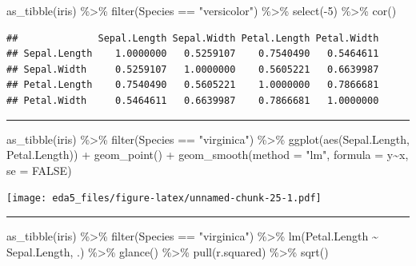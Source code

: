 \documentclass[
]{article}
\newenvironment{Shaded}{\begin{snugshade}}{\end{snugshade}}
\newcommand{\AttributeTok}[1]{\textcolor[rgb]{0.77,0.63,0.00}{#1}}
\newcommand{\ConstantTok}[1]{\textcolor[rgb]{0.00,0.00,0.00}{#1}}
\newcommand{\DecValTok}[1]{\textcolor[rgb]{0.00,0.00,0.81}{#1}}
\newcommand{\FunctionTok}[1]{\textcolor[rgb]{0.00,0.00,0.00}{#1}}
\newcommand{\NormalTok}[1]{#1}
\newcommand{\SpecialCharTok}[1]{\textcolor[rgb]{0.00,0.00,0.00}{#1}}
\newcommand{\StringTok}[1]{\textcolor[rgb]{0.31,0.60,0.02}{#1}}
\begin{document}
\begin{Shaded}
\begin{Highlighting}[]
\FunctionTok{as\_tibble}\NormalTok{(iris) }\SpecialCharTok{\%\textgreater{}\%} \FunctionTok{filter}\NormalTok{(Species }\SpecialCharTok{==} \StringTok{"versicolor"}\NormalTok{) }\SpecialCharTok{\%\textgreater{}\%} \FunctionTok{select}\NormalTok{(}\SpecialCharTok{{-}}\DecValTok{5}\NormalTok{) }\SpecialCharTok{\%\textgreater{}\%} \FunctionTok{cor}\NormalTok{()}
\end{Highlighting}
\end{Shaded}

\begin{verbatim}
##              Sepal.Length Sepal.Width Petal.Length Petal.Width
## Sepal.Length    1.0000000   0.5259107    0.7540490   0.5464611
## Sepal.Width     0.5259107   1.0000000    0.5605221   0.6639987
## Petal.Length    0.7540490   0.5605221    1.0000000   0.7866681
## Petal.Width     0.5464611   0.6639987    0.7866681   1.0000000
\end{verbatim}

\begin{center}\rule{0.5\linewidth}{0.5pt}\end{center}

\begin{Shaded}
\begin{Highlighting}[]
\FunctionTok{as\_tibble}\NormalTok{(iris) }\SpecialCharTok{\%\textgreater{}\%} \FunctionTok{filter}\NormalTok{(Species }\SpecialCharTok{==} \StringTok{"virginica"}\NormalTok{) }\SpecialCharTok{\%\textgreater{}\%} \FunctionTok{ggplot}\NormalTok{(}\FunctionTok{aes}\NormalTok{(Sepal.Length, Petal.Length)) }\SpecialCharTok{+} \FunctionTok{geom\_point}\NormalTok{() }\SpecialCharTok{+} \FunctionTok{geom\_smooth}\NormalTok{(}\AttributeTok{method =} \StringTok{"lm"}\NormalTok{, }\AttributeTok{formula =}\NormalTok{ y}\SpecialCharTok{\textasciitilde{}}\NormalTok{x, }\AttributeTok{se =} \ConstantTok{FALSE}\NormalTok{)}
\end{Highlighting}
\end{Shaded}

\texttt{[image: eda5\_files/figure-latex/unnamed-chunk-25-1.pdf]}

\begin{center}\rule{0.5\linewidth}{0.5pt}\end{center}

\begin{Shaded}
\begin{Highlighting}[]
\FunctionTok{as\_tibble}\NormalTok{(iris) }\SpecialCharTok{\%\textgreater{}\%} \FunctionTok{filter}\NormalTok{(Species }\SpecialCharTok{==} \StringTok{"virginica"}\NormalTok{) }\SpecialCharTok{\%\textgreater{}\%} \FunctionTok{lm}\NormalTok{(Petal.Length }\SpecialCharTok{\textasciitilde{}}\NormalTok{ Sepal.Length, .) }\SpecialCharTok{\%\textgreater{}\%} \FunctionTok{glance}\NormalTok{() }\SpecialCharTok{\%\textgreater{}\%} \FunctionTok{pull}\NormalTok{(r.squared) }\SpecialCharTok{\%\textgreater{}\%} \FunctionTok{sqrt}\NormalTok{()}
\end{Highlighting}
\end{Shaded}
\end{document}
